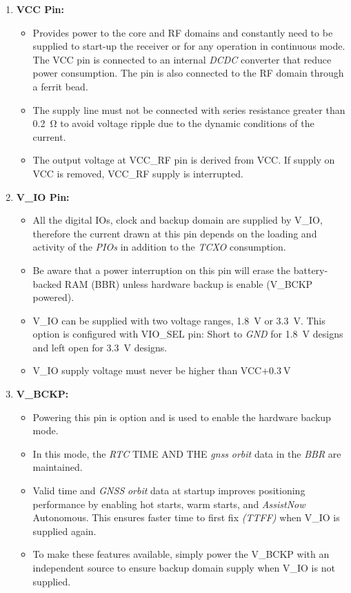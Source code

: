 \documentclass[report.tex]{subfiles}
\begin{document}
\begin{enumerate}
\item \textbf{VCC Pin:}
\begin{itemize}
\item Provides power to the core and RF domains and constantly need to be supplied to start-up the receiver or for any operation in continuous mode. The VCC pin is connected to an internal \textit{DCDC} converter that reduce power consumption. The pin is also connected to the RF domain through a ferrit bead.
\item \textbf{} The supply line must not be connected with series resistance greater than \SI{0.2}{\ohm} to avoid voltage ripple due to the dynamic conditions of the current.
\item  The output voltage at VCC\_RF pin is derived from VCC. If supply on VCC is removed, VCC\_RF supply is interrupted.\\
\end{itemize}
\item \textbf{V\_IO  Pin:}
\begin{itemize}
\item All the digital IOs, clock and backup domain are supplied by V\_IO, therefore the current drawn at this pin depends on the loading and activity of the \textit{PIOs} in addition to the \textit{TCXO} consumption.
\item Be aware that a power interruption on this pin will erase the battery-backed RAM (BBR) unless hardware backup is enable (V\_BCKP powered).
\item V\_IO can be supplied with two voltage ranges, \SI{1.8}{\volt} or \SI{3.3}{\volt}. This option is configured with VIO\_SEL pin: Short to \textit{GND} for \SI{1.8}{\volt} designs and left open for \SI{3.3}{\volt} designs.
\item \textbf{} V\_IO supply voltage must never be higher than VCC$+\SI{0.3}{\volt}$\\
\end{itemize}
\item \textbf{V\_BCKP:}
\begin{itemize}
\item Powering this pin is option and is used to enable the hardware backup mode.
\item In this mode, the \textit{RTC} TIME AND THE \textit{gnss} \textit{orbit} data in the \textit{BBR} are maintained.
\item Valid time and \textit{GNSS} \textit{orbit} data at startup improves positioning performance by enabling hot starts, warm starts, and \textit{AssistNow} Autonomous. This ensures faster
time to first fix \textit{(TTFF)} when V\_IO is supplied again.
\item To make these features available, simply power the V\_BCKP with an independent source to ensure backup domain supply when V\_IO is not supplied.\\
\end{itemize}


\end{enumerate}
\end{document}
